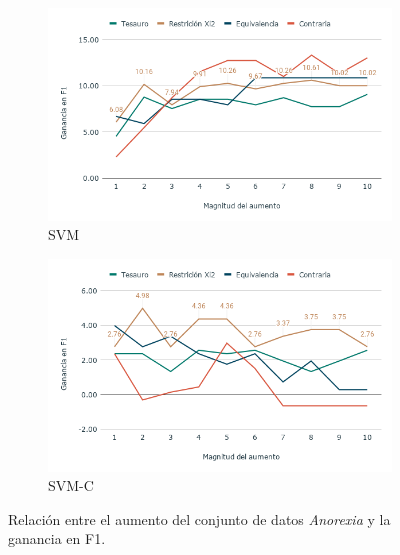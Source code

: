 \begin{figure}[hbt!]
    \begin{subfigure}[b]{0.5\textwidth}
        \includegraphics[width=\textwidth]{sections/figures/SVMAnox.png}
        \caption{SVM}
    \end{subfigure}
    \begin{subfigure}[b]{0.5\textwidth}
        \includegraphics[width=\textwidth]{sections/figures/SVM-CAnox.png}
        \caption{SVM-C}
    \end{subfigure}
    
    \caption{Relación entre el aumento del conjunto de datos \textit{Anorexia} y la ganancia en F1.}
    \label{fig:aumento_n_anorexia}
\end{figure}